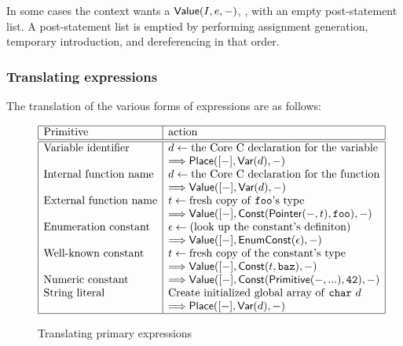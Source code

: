 \begin{docpart}
In some cases the
context wants a $\textsf{Value}(I,e,-)$, \ie, with an empty
post-statement list. A
post-statement list is emptied by performing assignment generation,
temporary introduction, and dereferencing in that order.

\subsubsection{Translating \ansiC expressions}
\label{sec:c2coreTransExpr}
The translation of the various forms of \ansiC expressions are as
follows:

\begin{figure}\begin{displaymath}\begin{array}{|l|l|}
\hline
\mbox{Primitive} & \mbox{action} \\
\hline
\hline
\mbox{Variable identifier} &
  d <- \mbox{the \coreC declaration for the variable} \\
& ==> \cons{Place}([-],\cons{Var}(d),-) \\
\mbox{Internal function name} &
  d <- \mbox{the \coreC declaration for the function} \\
& ==> \cons{Value}([-],\cons{Var}(d),-) \\
\mbox{External function name} &
  t <- \mbox{fresh copy of \syntax{foo}'s type} \\
& ==> \cons{Value}([-],\cons{Const}(\cons{Pointer}(-,t),\syntax{foo}),-) \\
\mbox{Enumeration constant} &
  \epsilon <- \mbox{(look up the constant's definiton)} \\
& ==> \cons{Value}([-],\cons{EnumConst}(\epsilon),-) \\
\mbox{Well-known constant} &
  t <- \mbox{fresh copy of the constant's type} \\
& ==> \cons{Value}([-],\cons{Const}(t,\syntax{baz}),-) \\
\mbox{Numeric constant} &
  ==> \cons{Value}([-],\cons{Const}(\cons{Primitive}(-,...),\syntax{42}),-) \\
\mbox{String literal} &
  \mbox{Create initialized global array of \syntax{char} $d$} \\
& ==> \cons{Place}([-],\cons{Var}(d),-) \\
\hline
\end{array}\end{displaymath}
\caption{Translating primary expressions}
\label{fig:c2corePrimary}
\end{figure}


\end{docpart}
